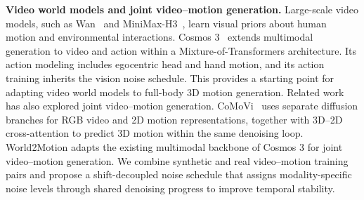 \noindent \textbf{Video world models and joint video--motion generation.} Large-scale video models, such as Wan~\citep{wan2025wan} and MiniMax-H3~\citep{minimaxh3}, learn visual priors about human motion and environmental interactions. Cosmos 3~\citep{agarwal2026cosmos} extends multimodal generation to video and action within a Mixture-of-Transformers architecture. Its action modeling includes egocentric head and hand motion, and its action training inherits the vision noise schedule. This provides a starting point for adapting video world models to full-body 3D motion generation. Related work has also explored joint video--motion generation. CoMoVi~\citep{zhao2026comovi} uses separate diffusion branches for RGB video and 2D motion representations, together with 3D--2D cross-attention to predict 3D motion within the same denoising loop. World2Motion adapts the existing multimodal backbone of Cosmos 3 for joint video--motion generation. We combine synthetic and real video--motion training pairs and propose a shift-decoupled noise schedule that assigns modality-specific noise levels through shared denoising progress to improve temporal stability.

